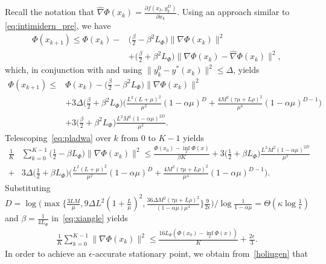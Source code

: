 \documentclass{osudissert96}
\begin{document}
Recall the notation that $\widehat \nabla\Phi(x_k) =\frac{\partial f(x_k,y^D_k)}{\partial x_k}$.
Using an approach similar to \cref{eq:intimidern_pre}, we have 
\begin{align}\label{eq:intimidern} 
\Phi(x_{k+1}) \leq\Phi(x_k) -&\Big(\frac{\beta}{2}-\beta^2 L_\Phi \Big)\| \nabla \Phi(x_k)\|^2 \nonumber
\\& +\Big(\frac{\beta}{2}+\beta^2 L_\Phi\Big)\|\nabla\Phi(x_k)-\widehat \nabla\Phi(x_k)\|^2,
\end{align}
which, in conjunction with  and using $\|y^0_k-y^*(x_k)\|^2\leq\Delta$, yields
\begin{align}\label{eq:pladwa}
\Phi(x_{k+1}) \leq & \Phi(x_k) -\Big(\frac{\beta}{2}-\beta^2 L_\Phi \Big)\| \nabla \Phi(x_k)\|^2 \nonumber
\\ &+3\Delta\Big(\frac{\beta}{2}+\beta^2 L_\Phi\Big)\Big( \frac{L^2(L+\mu)^2}{\mu^2} (1-\alpha\mu)^{D} +\frac{4M^2\left(  \tau\mu+ L\rho \right)^2}{\mu^4}(1-\alpha\mu)^{D-1} \Big) \nonumber
\\&+3\Big(\frac{\beta}{2}+\beta^2 L_\Phi\Big)\frac{L^2M^2(1-\alpha\mu)^{2D}}{\mu^2}.
\end{align}
Telescoping~\cref{eq:pladwa} over $k$ from $0$ to $K-1$ yields
\begin{align}\label{eq:xiangle}
\frac{1}{K}&\sum_{k=0}^{K-1}\Big(\frac{1}{2}-\beta L_\Phi \Big)\| \nabla \Phi(x_k)\|^2 \leq \frac{ \Phi(x_0)-\inf_x\Phi(x)}{\beta K} +3\Big(\frac{1}{2}+\beta L_\Phi\Big)\frac{L^2M^2(1-\alpha\mu)^{2D}}{\mu^2} \nonumber
\\+& 3\Delta\Big(\frac{1}{2}+\beta L_\Phi\Big)\Big( \frac{L^2(L+\mu)^2}{\mu^2} (1-\alpha\mu)^{D} +\frac{4M^2\left(  \tau\mu+ L\rho \right)^2}{\mu^4}(1-\alpha\mu)^{D-1} \Big). 
\end{align}
Substituting {\small$D=\log\Big(\max\big\{\frac{3LM}{\mu},9\Delta L^2(1+\frac{L}{\mu})^2,\frac{36\Delta M^2(\tau\mu+L\rho)^2}{(1-\alpha\mu)\mu^4}  \big\}\frac{9}{2\epsilon}\Big)/\log\frac{1}{1-\alpha\mu}=\Theta(\kappa\log\frac{1}{\epsilon})$} and $\beta=\frac{1}{4L_\Phi}$ in~\cref{eq:xiangle} yields
\begin{align}\label{holiugen}
\frac{1}{K}\sum_{k=0}^{K-1}\| \nabla \Phi(x_k)\|^2 \leq \frac{16 L_\Phi (\Phi(x_0)-\inf_x\Phi(x))}{K} + \frac{2\epsilon}{3}.
\end{align}
In order to achieve an $\epsilon$-accurate stationary point, we obtain from~\cref{holiugen} that 
\end{document}
